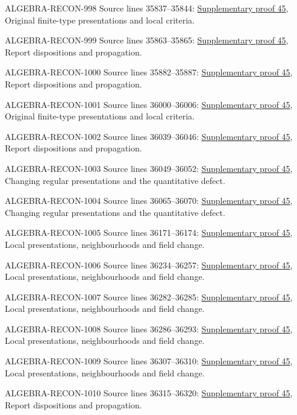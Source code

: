 \begin{AlgebraSourceRoutes}
\item[ALGEBRA-RECON-998] Source lines 35837--35844: \hyperlink{algebra_lci_notes_20260928}{Supplementary proof 45}, Original finite-type presentations and local criteria.
\item[ALGEBRA-RECON-999] Source lines 35863--35865: \hyperlink{algebra_lci_notes_20260928}{Supplementary proof 45}, Report dispositions and propagation.
\item[ALGEBRA-RECON-1000] Source lines 35882--35887: \hyperlink{algebra_lci_notes_20260928}{Supplementary proof 45}, Report dispositions and propagation.
\item[ALGEBRA-RECON-1001] Source lines 36000--36006: \hyperlink{algebra_lci_notes_20260928}{Supplementary proof 45}, Original finite-type presentations and local criteria.
\item[ALGEBRA-RECON-1002] Source lines 36039--36046: \hyperlink{algebra_lci_notes_20260928}{Supplementary proof 45}, Report dispositions and propagation.
\item[ALGEBRA-RECON-1003] Source lines 36049--36052: \hyperlink{algebra_lci_notes_20260928}{Supplementary proof 45}, Changing regular presentations and the quantitative defect.
\item[ALGEBRA-RECON-1004] Source lines 36065--36070: \hyperlink{algebra_lci_notes_20260928}{Supplementary proof 45}, Changing regular presentations and the quantitative defect.
\item[ALGEBRA-RECON-1005] Source lines 36171--36174: \hyperlink{algebra_lci_notes_20260928}{Supplementary proof 45}, Local presentations, neighbourhoods and field change.
\item[ALGEBRA-RECON-1006] Source lines 36234--36257: \hyperlink{algebra_lci_notes_20260928}{Supplementary proof 45}, Local presentations, neighbourhoods and field change.
\item[ALGEBRA-RECON-1007] Source lines 36282--36285: \hyperlink{algebra_lci_notes_20260928}{Supplementary proof 45}, Local presentations, neighbourhoods and field change.
\item[ALGEBRA-RECON-1008] Source lines 36286--36293: \hyperlink{algebra_lci_notes_20260928}{Supplementary proof 45}, Local presentations, neighbourhoods and field change.
\item[ALGEBRA-RECON-1009] Source lines 36307--36310: \hyperlink{algebra_lci_notes_20260928}{Supplementary proof 45}, Local presentations, neighbourhoods and field change.
\item[ALGEBRA-RECON-1010] Source lines 36315--36320: \hyperlink{algebra_lci_notes_20260928}{Supplementary proof 45}, Report dispositions and propagation.

\end{AlgebraSourceRoutes}
